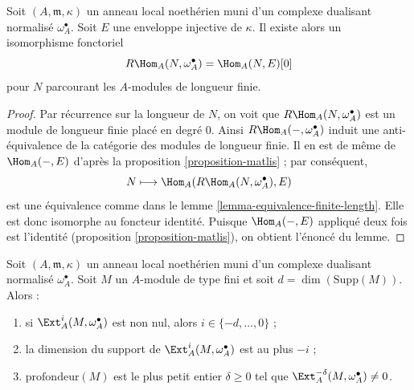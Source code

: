\begin{lemma}
\label{lemma-dualizing-finite-length}
Soit $(A, \mathfrak m, \kappa)$ un anneau local noethérien muni d'un complexe dualisant
normalisé $\omega_A^\bullet$. Soit $E$ une enveloppe injective de $\kappa$.
Il existe alors un isomorphisme fonctoriel
$$
R\Hom_A(N, \omega_A^\bullet) = \Hom_A(N, E)[0]
$$
pour $N$ parcourant les $A$-modules de longueur finie.
\end{lemma}

\begin{proof}
Par récurrence sur la longueur de $N$, on voit que $R\Hom_A(N, \omega_A^\bullet)$
est un module de longueur finie placé en degré $0$.
Ainsi $R\Hom_A(-, \omega_A^\bullet)$ induit une anti-équivalence de la catégorie
des modules de longueur finie. Il en est de même de $\Hom_A(-, E)$
d'après la proposition \ref{proposition-matlis} ; par conséquent,
$$
N \longmapsto \Hom_A(R\Hom_A(N, \omega_A^\bullet), E)
$$
est une équivalence comme dans le lemme \ref{lemma-equivalence-finite-length}.
Elle est donc isomorphe au foncteur identité.
Puisque $\Hom_A(-, E)$ appliqué deux fois est l'identité
(proposition \ref{proposition-matlis}), on obtient l'énoncé du lemme.
\end{proof}

\begin{lemma}
\label{lemma-sitting-in-degrees}
Soit $(A, \mathfrak m, \kappa)$ un anneau local noethérien muni d'un complexe dualisant normalisé $\omega_A^\bullet$.
Soit $M$ un $A$-module de type fini et soit $d = \dim(\text{Supp}(M))$. Alors :
\begin{enumerate}
\item si $\Ext^i_A(M, \omega_A^\bullet)$ est non nul, alors $i \in \{-d, \ldots, 0\}$ ;
\item la dimension du support de $\Ext^i_A(M, \omega_A^\bullet)$ est au plus $-i$ ;
\item $\text{profondeur}(M)$ est le plus petit entier $\delta \geq 0$ tel que $\Ext^{-\delta}_A(M, \omega_A^\bullet) \not = 0$.
\end{enumerate}
\end{lemma}

